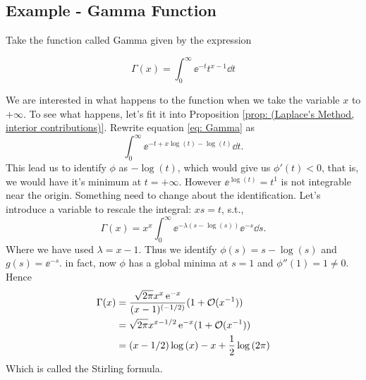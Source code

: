\subsection{Example - Gamma Function}

Take the function called Gamma given by the expression

\begin{equation}
	\Gamma(x) = \int_{0}^{\infty} \ee^{-t} t^{x-1} \dd t
	\label{eq: Gamma}
\end{equation}

We are interested in what happens to the function when we take the variable $x$ to $+\infty$. To see what happens, let's fit it into Proposition \ref{prop: (Laplace's Method, interior contributions)}. Rewrite equation \ref{eq: Gamma} as
$$\int_{0}^{\infty} \ee^{-t+x\log{(t)}-\log{(t)}} \dd t.$$ 
This lead us to identify $\phi$ as $-\log{(t)}$, which would give us $\phi'(t) < 0$, that is, we would have it's minimum at $t=+\infty$. However $\ee^{\log{(t)}} = t^1$ is not integrable near the origin. Something need to change about the identification. Let's introduce a variable to rescale the integral: $xs = t$, s.t.,
$$\Gamma(x) = x^x \int_{0}^{\infty} \ee^{-\lambda(s - \log{(s)})} \ee^{-s} \dd s.$$
Where we have used $\lambda = x - 1$. Thus we identify $\phi(s) = s - \log(s)$ and $g(s) = \ee^{-s}$. in fact, now $\phi$ has a global minima at $s = 1$ and $\phi''(1) = 1 \neq 0$. Hence
\begin{equation*}
	\begin{split}
		\Gamma(x) & = \frac{\sqrt{2\pi} x^x \operatorname{e}^{-x}}{(x-1)^{(-1/2)}} (1 + \mathcal{O}(x^{-1})) \\
		& = \sqrt{2\pi} x^{x - 1/2} \operatorname{e}^{-x} (1 + \mathcal{O}(x^{-1})) \\
		& = (x-1/2)\log{(x)} - x + \frac{1}{2} \log{(2\pi)}
	\end{split}
\end{equation*} 
Which is called the Stirling formula.